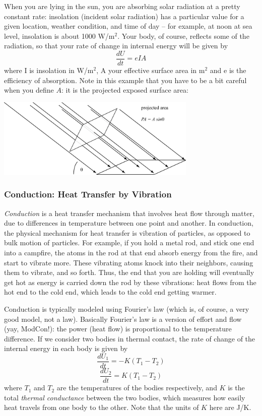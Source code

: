 \documentclass[10pt]{book}
\newcommand{\beforefig}{\vspace{0.2in}}
\newcommand{\afterfig}{\vspace{0.2in}}
\begin{document}
When you are lying in the sun, you are absorbing solar radiation at a pretty constant rate: insolation (incident solar radiation) has a particular value for a given location, weather condition, and time of day -- for example, at noon at sea level, insolation is about 1000 W/m$^2$.  Your body, of course, reflects some of the radiation, so that your rate of change in internal energy will be given by 
$$\frac{dU}{dt} = e I A$$
where  I is insolation in W/m$^2$, A your effective surface area in m$^2$ and e is the efficiency of absorption.  Note in this example that you have to be a bit careful when you define $A$:  it is the projected exposed surface area:


\beforefig
 \centerline{\includegraphics[height=1.5in]{figs/ProjectedArea}}
\afterfig

\subsubsection{Conduction: Heat Transfer by Vibration}

{\it Conduction} is a heat transfer mechanism that involves heat flow through matter, due to differences in temperature between one point and another.  In conduction, the physical mechanism for heat transfer is vibration of particles, as opposed to bulk motion of particles. For example, if you hold a metal rod, and stick one end into a campfire, the atoms in the rod at that end absorb energy from the fire, and start to vibrate more.  These vibrating atoms knock into their neighbors, causing them to vibrate, and so forth.  Thus, the end that you are holding will eventually get hot as energy is carried down the rod by these vibrations: heat flows from the hot end to the cold end, which leads to the cold end getting warmer. 

Conduction is typically modeled using Fourier's law (which is, of course, a very good model, not a law).  Basically Fourier's law is a version of effort and flow (yay, ModCon!):  the power (heat flow) is proportional to the temperature difference.  If we consider two bodies in thermal contact,  the rate of change of the internal energy in each body is given by
$$\frac{dU_1}{dt} =  -K(T_1 - T_2)$$ 
$$\frac{dU_2}{dt} = K(T_1 - T_2)$$ 
where $T_1$ and $T_2$ are the temperatures of the bodies respectively, and $K$ is the total {\it thermal conductance} between the two bodies, which measures how easily heat travels from one body to the other.  Note that the units of $K$ here are J/K.
\end{document}
